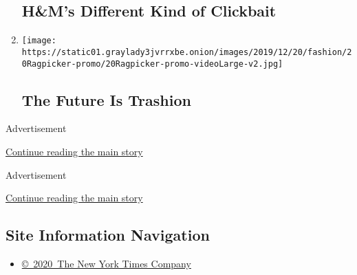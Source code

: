 \begin{enumerate}
  \href{/2019/12/18/fashion/hms-supply-chain-transparency.html}{}

  \hypertarget{hms-different-kind-of-clickbait}{%
  \subsection{H\&M's Different Kind of
  Clickbait}\label{hms-different-kind-of-clickbait}}
\item
  \texttt{[image: https://static01.graylady3jvrrxbe.onion/images/2019/12/20/fashion/20Ragpicker-promo/20Ragpicker-promo-videoLarge-v2.jpg]}

  \href{/2019/12/20/style/zero-waste-daniel-trashion.html}{}

  \hypertarget{the-future-is-trashion}{%
  \subsection{The Future Is Trashion}\label{the-future-is-trashion}}
\end{enumerate}

Advertisement

\protect\hyperlink{after-mid2}{Continue reading the main story}

Advertisement

\protect\hyperlink{after-bottom}{Continue reading the main story}

\hypertarget{site-information-navigation}{%
\subsection{Site Information
Navigation}\label{site-information-navigation}}

\begin{itemize}
\tightlist
\item
  \href{https://help.nytimes3xbfgragh.onion/hc/en-us/articles/115014792127-Copyright-notice}{©~2020~The
  New York Times Company}
\end{itemize}

